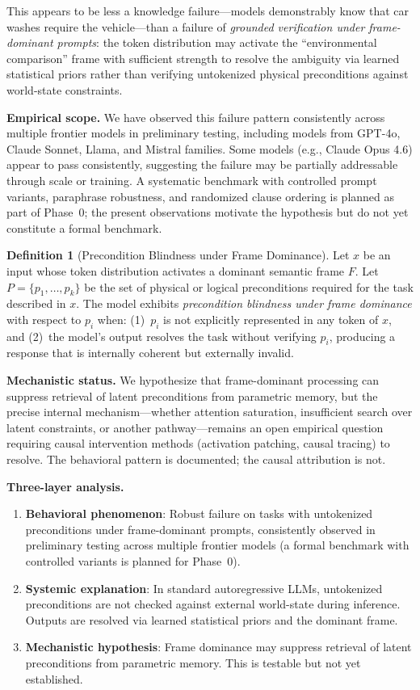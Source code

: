 \documentclass[11pt,a4paper]{article}
\theoremstyle{definition}
\newtheorem{definition}{Definition}[section]
\begin{document}
This appears to be less a knowledge failure---models demonstrably know that car washes require the vehicle---than a failure of \emph{grounded verification under frame-dominant prompts}: the token distribution may activate the ``environmental comparison'' frame with sufficient strength to resolve the ambiguity via learned statistical priors rather than verifying untokenized physical preconditions against world-state constraints.

\textbf{Empirical scope.} We have observed this failure pattern consistently across multiple frontier models in preliminary testing, including models from GPT-4o, Claude Sonnet, Llama, and Mistral families. Some models (e.g., Claude Opus 4.6) appear to pass consistently, suggesting the failure may be partially addressable through scale or training. A systematic benchmark with controlled prompt variants, paraphrase robustness, and randomized clause ordering is planned as part of Phase~0; the present observations motivate the hypothesis but do not yet constitute a formal benchmark.

\begin{definition}[Precondition Blindness under Frame Dominance]
\label{def:precondblind}
Let $x$ be an input whose token distribution activates a dominant semantic frame $F$. Let $P = \{p_1, \ldots, p_k\}$ be the set of physical or logical preconditions required for the task described in $x$. The model exhibits \emph{precondition blindness under frame dominance} with respect to $p_i$ when: (1)~$p_i$ is not explicitly represented in any token of $x$, and (2)~the model's output resolves the task without verifying $p_i$, producing a response that is internally coherent but externally invalid.
\end{definition}

\textbf{Mechanistic status.} We hypothesize that frame-dominant processing can suppress retrieval of latent preconditions from parametric memory, but the precise internal mechanism---whether attention saturation, insufficient search over latent constraints, or another pathway---remains an open empirical question requiring causal intervention methods (activation patching, causal tracing) to resolve. The behavioral pattern is documented; the causal attribution is not.

\textbf{Three-layer analysis.}
\begin{enumerate}[leftmargin=*,itemsep=2pt]
\item \textbf{Behavioral phenomenon}: Robust failure on tasks with untokenized preconditions under frame-dominant prompts, consistently observed in preliminary testing across multiple frontier models (a formal benchmark with controlled variants is planned for Phase~0).
\item \textbf{Systemic explanation}: In standard autoregressive LLMs, untokenized preconditions are not checked against external world-state during inference. Outputs are resolved via learned statistical priors and the dominant frame.
\item \textbf{Mechanistic hypothesis}: Frame dominance may suppress retrieval of latent preconditions from parametric memory. This is testable but not yet established.
\end{enumerate}
\end{document}
